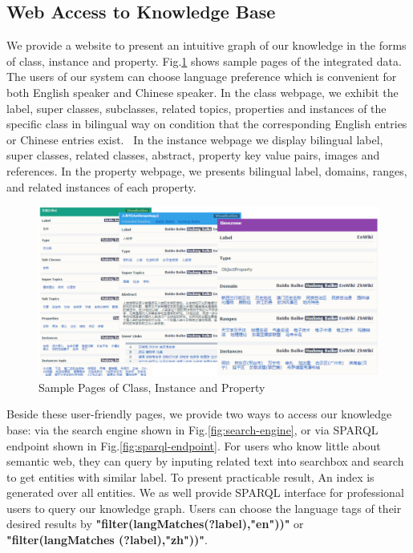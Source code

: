 \documentclass[runningheads,a4paper]{llncs}
\begin{document}
\subsection{Web Access to Knowledge Base}
We provide a website to present an intuitive graph of our knowledge in the forms of class, instance and property. Fig.\ref{fig:xlore} shows sample pages of the integrated data. The users of our system can choose language preference which is convenient for both English speaker and Chinese speaker. In the class webpage, we exhibit the label, super classes, subclasses, related topics, properties and instances of the specific class in bilingual way on condition that the corresponding English entries or Chinese entries exist.  In the instance webpage we display bilingual label, super classes, related classes, abstract, property key value pairs, images and references. In the property webpage, we presents bilingual label, domains, ranges, and related instances of each property. 
\begin{figure}[ht]
    \centerline{\includegraphics[width=1\columnwidth]{fig/xlore}}
    \caption{Sample Pages of Class, Instance and Property}
    \label{fig:xlore}
\end{figure}%
Beside these user-friendly pages, we provide two ways to access our knowledge base: via the search engine shown in Fig.\ref{fig:search-engine}, or via SPARQL endpoint shown in Fig.\ref{fig:sparql-endpoint}. For users who know little about semantic web, they can query by inputing related text into searchbox and search to get entities with similar label. To present practicable result, An index is generated over all entities. We as well provide SPARQL interface for professional users to query our knowledge graph. Users can choose the language tags of their desired results by \textbf{"filter(langMatches(?label),"en"))"} or \textbf{"filter(langMatches (?label),"zh"))"}.
\end{document}
